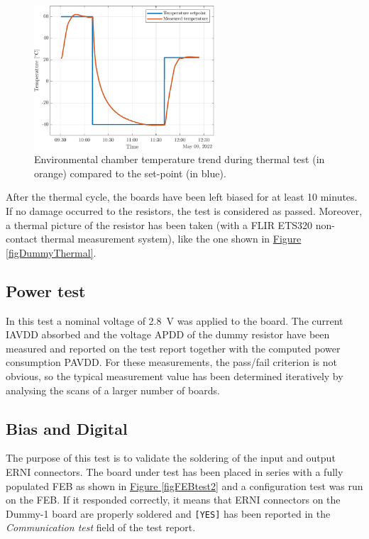 \begin{figure}[h!]
    \centering
    \includegraphics[width=0.6\textwidth]{Images/chap2/chamber_temperature.pdf}
    \caption{Environmental chamber temperature trend during thermal test (in orange) compared to the set-point (in blue).}
    \label{figDUMMYtemp}
\end{figure}

After the thermal cycle, the boards have been left biased for at least 10 minutes. If no damage occurred to the resistors, the test is considered as passed. Moreover, a thermal picture of the resistor has been taken (with a FLIR ETS320 non-contact thermal measurement system), like the one shown in \hyperref[figDummyThermal]{Figure \ref{figDummyThermal}}.


\subsection{Power test}
In this test a nominal voltage of \SI{2.8}{\volt} was applied to the board. The current IAVDD absorbed and the voltage APDD of the dummy resistor have been measured and reported on the test report together with the computed power consumption PAVDD. For these measurements, the pass/fail criterion is not obvious, so the typical measurement value has been determined iteratively by analysing the scans of a larger number of boards.


\subsection{Bias and Digital}
The purpose of this test is to validate the soldering of the input and output ERNI connectors. The board under test has been placed in series with a fully populated FEB as shown in \hyperref[figFEBtest2]{Figure \ref{figFEBtest2}} and a configuration test was run on the FEB. If it responded correctly, it means that ERNI connectors on the Dummy-1 board are properly soldered and \texttt{[YES]} has been reported in the \textit{Communication test} field of the test report.

